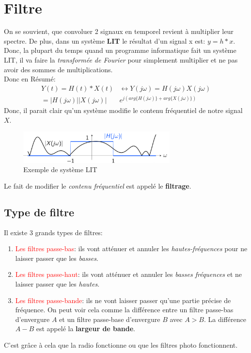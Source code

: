 \documentclass{report}
\begin{document}
\section{Filtre}
On se souvient, que convoluer 2 signaux en temporel revient à multiplier leur spectre. De plus, dans un système \textbf{LIT} le résultat d'un signal x est: $y = h\ast x$. Donc, la plupart du temps quand un programme informatique fait un système LIT, il va faire la \textit{transformée de Fourier} pour simplement multiplier et ne pas avoir des sommes de multiplications.\\
Donc en Résumé:
\begin{align*}
Y(t) = H(t) \ast X(t) &\longleftrightarrow Y(j\omega) = H(j \omega) X(j \omega)\\
=|H(j \omega)||X(j \omega)|&e^{j(arg\{H(j\omega )\}+ arg\{X(j \omega) \})}
\end{align*}
Donc, il parait clair qu'un système modifie le contenu fréquentiel de notre signal $X$.
\begin{figure}[H]
\centering
\includegraphics[width=8cm]{img/signalFreq.png}
\caption{Exemple de système LIT}
\end{figure}
Le fait de modifier le \textit{contenu fréquentiel} est appelé le \textbf{filtrage}.
\subsection{Type de filtre}
Il existe 3 grands types de filtres:
\begin{enumerate}
\item \textcolor{red}{Les filtres passe-bas}: ils vont atténuer et annuler les \textit{hautes-fréquences} pour ne laisser passer que les \textit{basses}.
\item \textcolor{red}{Les filtres passe-haut}: ils vont atténuer et annuler les \textit{basses fréquences} et ne laisser passer que les \textit{hautes}.
\item \textcolor{red}{Les filtres passe-bande}: ils ne vont laisser passer qu'une partie précise de fréquence. On peut voir cela comme la différence entre un filtre passe-bas d'envergure $A$ et un filtre passe-base d'envergure $B$ avec $A>B$. La différence $A-B$ est appelé la \textbf{largeur de bande}. 
\end{enumerate}
C'est grâce à cela que la radio fonctionne ou que les filtres photo fonctionnent.\\
\end{document}
